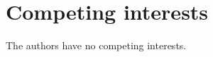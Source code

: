 \documentclass[preprint]{seismica}
\begin{document}
\section*{Competing interests}
    The authors have no competing interests.


   
\end{document}
